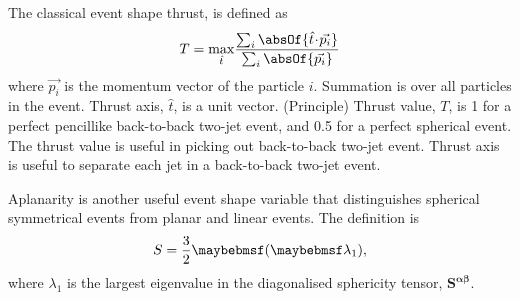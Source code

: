 The classical event shape thrust\cite{PhysRevLett.39.1587}, is defined as
\begin{equation}
T = \max_{\hat{t}}\!\frac{\sum_{i}\absOf{\hat{t}\!\cdot\!\vec{p_{i}}}}{\sum_{i}\absOf{\vec{p_{i}}}}
\end{equation}
where $\vec{p_{i}}$ is the momentum vector of the particle $i$. Summation is over all particles in the event. Thrust axis, $\hat{t}$, is a unit vector. (Principle) Thrust value, $T$, is 1 for a perfect pencillike back-to-back two-jet event, and 0.5 for a perfect spherical event. The thrust value is useful in picking out back-to-back two-jet event. Thrust axis is useful to separate each jet in a back-to-back two-jet event.

Aplanarity is another useful event shape variable that distinguishes spherical symmetrical events from planar and linear events. The definition is
\begin{equation}
S = \frac{3}{2}\parenths{\lambda_{1}},
\end{equation}
where $\lambda_{1}$ is the largest eigenvalue in the diagonalised sphericity tensor, $\bm{S^{\alpha\beta}}$.



